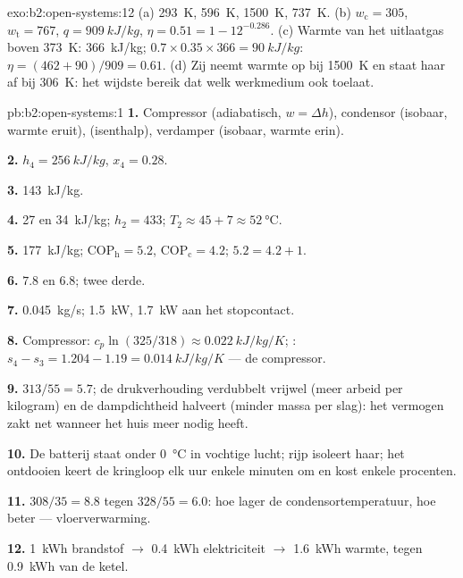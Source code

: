 \begin{solution}{exo:b2:open-systems:12}
(a) \qty{293}{K}, \qty{596}{K}, \qty{1500}{K}, \qty{737}{K}. (b)
$w_{\text{c}} = 305$,
$w_{\text{t}} = 767$, $q = \qty{909}{kJ/kg}$, $\eta = 0.51 = 1 - 12^{-0.286}$. (c)
Warmte van het uitlaatgas boven \qty{373}{K}: \qty{366}{kJ/kg};
$0.7 \times 0.35 \times 366 =
\qty{90}{kJ/kg}$:
$\eta = (462 + 90)/909 = 0.61$. (d) Zij neemt warmte op bij
\qty{1500}{K} en staat haar af bij \qty{306}{K}: het wijdste bereik dat welk
werkmedium ook toelaat.
\end{solution}

\begin{solution}{pb:b2:open-systems:1}
\textbf{1.} Compressor (adiabatisch, $w = \Delta h$), condensor (isobaar, warmte
eruit),  (isenthalp), verdamper (isobaar, warmte erin).

\textbf{2.} $h_4 = \qty{256}{kJ/kg}$, $x_4 = 0.28$.

\textbf{3.} \qty{143}{kJ/kg}.

\textbf{4.} \qty{27}{} en \qty{34}{kJ/kg}; $h_2 = 433$;
$T_2 \approx 45 + 7 \approx
\qty{52}{\celsius}$.

\textbf{5.} \qty{177}{kJ/kg}; $\mathrm{COP}_{\text{h}} = 5.2$,
$\mathrm{COP}_{\text{c}} = 4.2$;
$5.2 = 4.2 + 1$.

\textbf{6.} $7.8$ en $6.8$; twee derde.

\textbf{7.} \qty{0.045}{kg/s}; \qty{1.5}{kW}, \qty{1.7}{kW} aan het stopcontact.

\textbf{8.} Compressor: $c_p\ln(325/318) \approx \qty{0.022}{kJ/kg/K}$;
: $s_4 - s_3 = 1.204 - 1.19 = \qty{0.014}{kJ/kg/K}$ --- de compressor.

\textbf{9.} $313/55 = 5.7$; de drukverhouding verdubbelt vrijwel (meer arbeid
per kilogram) en de dampdichtheid halveert (minder massa per slag):
het vermogen zakt net wanneer het huis meer nodig heeft.

\textbf{10.} De batterij staat onder \qty{0}{\celsius} in vochtige lucht; rijp
isoleert haar; het ontdooien keert de kringloop elk uur enkele minuten om en
kost enkele procenten.

\textbf{11.} $308/35 = 8.8$ tegen $328/55 = 6.0$: hoe lager de
condensortemperatuur, hoe beter --- vloerverwarming.

\textbf{12.} \qty{1}{kWh} brandstof $\to$ \qty{0.4}{kWh} elektriciteit $\to$
\qty{1.6}{kWh} warmte, tegen \qty{0.9}{kWh} van de ketel.


\end{solution}
